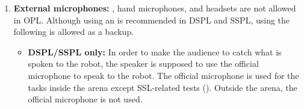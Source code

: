 \begin{enumerate}
	\item \textbf{External microphones: }, hand microphones, and headsets are not allowed in OPL. Although using an  is recommended in DSPL and SSPL, using the following  is allowed as a backup.
	\begin{itemize}
	\item \textbf{DSPL/SSPL only: }In order to make the audience to catch what is spoken to the robot, the speaker is supposed to use the official microphone to speak to the robot. The official microphone is used for the tasks inside the arena except SSL-related tests (). Outside the arena, the official microphone is not used.
	\end{itemize}
\end{enumerate}


